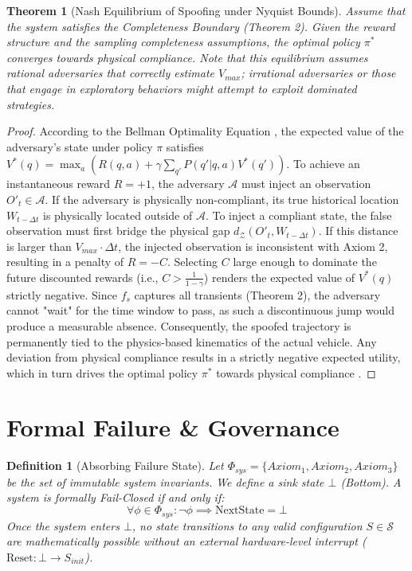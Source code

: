 \documentclass[conference]{IEEEtran}
\newtheorem{theorem}{Theorem}
\newtheorem{definition}{Definition}
\newcommand{\Z}{\mathcal{Z}} %
\newcommand{\Sstate}{\mathcal{S}} %
\newcommand{\Auth}{\mathcal{A}} %
\begin{document}
\begin{theorem}[Nash Equilibrium of Spoofing under Nyquist Bounds]
Assume that the system satisfies the Completeness Boundary (Theorem 2). Given the reward structure and the sampling completeness assumptions, the optimal policy $\pi^*$ converges towards physical compliance. Note that this equilibrium assumes rational adversaries that correctly estimate $V_{max}$; irrational adversaries or those that engage in exploratory behaviors might attempt to exploit dominated strategies.
\end{theorem}
\begin{proof}
According to the Bellman Optimality Equation \cite{b10}, the expected value of the adversary’s state under policy $\pi$ satisfies $V^*(q) = \max_a (R(q, a) + \gamma \sum_{q'} P(q'|q,a)V^*(q'))$. To achieve an instantaneous reward $R = +1$, the adversary $\mathcal{A}$ must inject an observation $O'_{t} \in \Auth$. If the adversary is physically non-compliant, its true historical location $W_{t-\Delta t}$ is physically located outside of $\Auth$. To inject a compliant state, the false observation must first bridge the physical gap $d_\Z(O'_{t}, W_{t-\Delta t})$. If this distance is larger than $V_{max} \cdot \Delta t$, the injected observation is inconsistent with Axiom 2, resulting in a penalty of $R = -C$. Selecting $C$ large enough to dominate the future discounted rewards (i.e., $C > \frac{1}{1-\gamma}$) renders the expected value of $V^*(q)$ strictly negative. Since $f_s$ captures all transients (Theorem 2), the adversary cannot "wait" for the time window to pass, as such a discontinuous jump would produce a measurable absence. Consequently, the spoofed trajectory is permanently tied to the physics-based kinematics of the actual vehicle. Any deviation from physical compliance results in a strictly negative expected utility, which in turn drives the optimal policy $\pi^*$ towards physical compliance \cite{b11, b21}.
\end{proof}

\section{Formal Failure \& Governance}

\begin{definition}[Absorbing Failure State]
Let $\Phi_{sys} = \{ Axiom_1, Axiom_2, Axiom_3 \}$ be the set of immutable system invariants. We define a sink state $\bot$ (Bottom). A system is formally \textit{Fail-Closed} if and only if:
\begin{equation}
\forall \phi \in \Phi_{sys}: \neg \phi \implies \text{NextState} = \bot
\end{equation}
Once the system enters $\bot$, no state transitions to any valid configuration $S \in \Sstate$ are mathematically possible without an external hardware-level interrupt ($\text{Reset}: \bot \to S_{init}$).
\end{definition}
\end{document}
